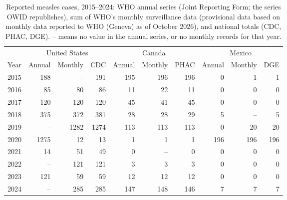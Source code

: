 \begin{table}[htbp]
\centering
\small
\setlength{\tabcolsep}{4pt}
\caption{Reported measles cases, 2015--2024: WHO annual series (Joint Reporting Form; the series OWID republishes), sum of WHO's monthly surveillance data (provisional data based on monthly data reported to WHO (Geneva) as of October 2026), and national totals (CDC, PHAC, DGE). -- means no value in the annual series, or no monthly records for that year.}
\label{tab:whocheck}
\begin{tabular}{r rrr rrr rrr}
\toprule
 & \multicolumn{3}{c}{United States} & \multicolumn{3}{c}{Canada} & \multicolumn{3}{c}{Mexico} \\
\cmidrule(lr){2-4} \cmidrule(lr){5-7} \cmidrule(lr){8-10}
Year & Annual & Monthly & CDC & Annual & Monthly & PHAC & Annual & Monthly & DGE \\
\midrule
2015 & 188 & -- & 191 & 195 & 196 & 196 & 0 & 1 & 1 \\
2016 & 85 & 80 & 86 & 11 & 22 & 11 & 0 & 0 & 0 \\
2017 & 120 & 120 & 120 & 45 & 41 & 45 & 0 & 0 & 0 \\
2018 & 375 & 372 & 381 & 28 & 28 & 29 & 5 & -- & 5 \\
2019 & -- & 1282 & 1274 & 113 & 113 & 113 & 0 & 20 & 20 \\
2020 & 1275 & 12 & 13 & 1 & 1 & 1 & 196 & 196 & 196 \\
2021 & 14 & 51 & 49 & 0 & -- & 0 & 0 & 0 & 0 \\
2022 & -- & 121 & 121 & 3 & 3 & 3 & 0 & 0 & 0 \\
2023 & 121 & 59 & 59 & 12 & 12 & 12 & 0 & 0 & 0 \\
2024 & -- & 285 & 285 & 147 & 148 & 146 & 7 & 7 & 7 \\
\bottomrule
\end{tabular}
\end{table}
